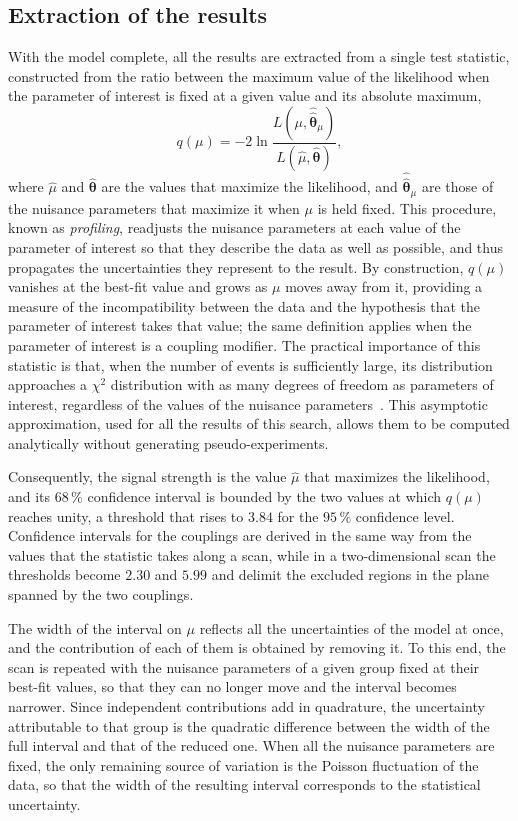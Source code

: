 \subsection{Extraction of the results}
\label{subsec:bbtt_teststat}
%
With the model complete, all the results are extracted from a single test statistic, constructed from the ratio between the maximum value of the likelihood when the parameter of interest is fixed at a given value and its absolute maximum,
\begin{equation}
    q(\mu) = -2\ln\frac{L(\mu,\hat{\hat{\boldsymbol{\theta}}}_\mu)}{L(\hat{\mu},\hat{\boldsymbol{\theta}})},
    \label{eq:test_statistic}
\end{equation}
where $\hat{\mu}$ and $\hat{\boldsymbol{\theta}}$ are the values that maximize the likelihood, and $\hat{\hat{\boldsymbol{\theta}}}_\mu$ are those of the nuisance parameters that maximize it when $\mu$ is held fixed. This procedure, known as \textit{profiling}, readjusts the nuisance parameters at each value of the parameter of interest so that they describe the data as well as possible, and thus propagates the uncertainties they represent to the result. By construction, $q(\mu)$ vanishes at the best-fit value and grows as $\mu$ moves away from it, providing a measure of the incompatibility between the data and the hypothesis that the parameter of interest takes that value; the same definition applies when the parameter of interest is a coupling modifier. The practical importance of this statistic is that, when the number of events is sufficiently large, its distribution approaches a $\chi^2$ distribution with as many degrees of freedom as parameters of interest, regardless of the values of the nuisance parameters~\cite{Wilks:1938dza,Cowan:2010js}. This asymptotic approximation, used for all the results of this search, allows them to be computed analytically without generating pseudo-experiments.

Consequently, the signal strength is the value $\hat{\mu}$ that maximizes the likelihood, and its $68\,\%$ confidence interval is bounded by the two values at which $q(\mu)$ reaches unity, a threshold that rises to $3.84$ for the $95\,\%$ confidence level. Confidence intervals for the couplings are derived in the same way from the values that the statistic takes along a scan, while in a two-dimensional scan the thresholds become $2.30$ and $5.99$ and delimit the excluded regions in the plane spanned by the two couplings. 

The width of the interval on $\mu$ reflects all the uncertainties of the model at once, and the contribution of each of them is obtained by removing it. To this end, the scan is repeated with the nuisance parameters of a given group fixed at their best-fit values, so that they can no longer move and the interval becomes narrower. Since independent contributions add in quadrature, the uncertainty attributable to that group is the quadratic difference between the width of the full interval and that of the reduced one. When all the nuisance parameters are fixed, the only remaining source of variation is the Poisson fluctuation of the data, so that the width of the resulting interval corresponds to the statistical uncertainty.

